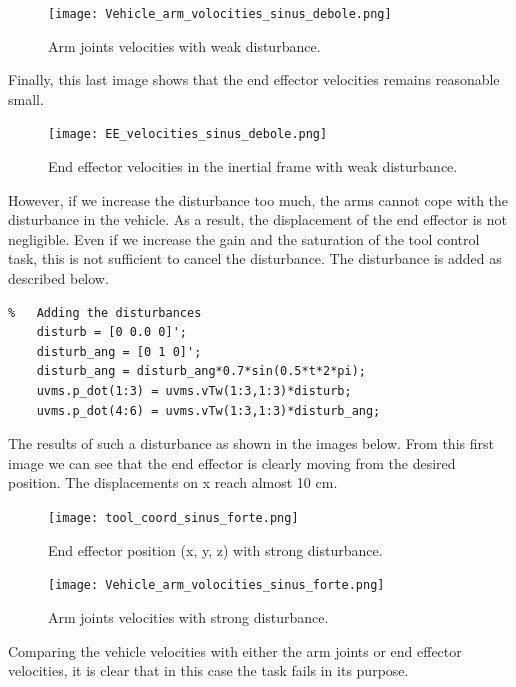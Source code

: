 \documentclass{article}
\begin{document}
\begin{figure}[H]
	\centering
	{\texttt{[image: Vehicle\_arm\_volocities\_sinus\_debole.png]}}
	\caption{Arm joints velocities with weak disturbance.}
	\label{im:arm_vel2}
\end{figure}
Finally, this last image shows that the end effector velocities remains reasonable small.  \\ 

\begin{figure}[H]
	\centering
	{\texttt{[image: EE\_velocities\_sinus\_debole.png]}}
	\caption{End effector velocities in the inertial frame with weak disturbance.}
	\label{im:tool_vel2}
\end{figure}
However, if we increase the disturbance too much, the arms cannot cope with the disturbance in the vehicle. As a result, the displacement of the end effector is not negligible. Even if we increase the gain and the saturation of the tool control task, this is not sufficient to cancel the disturbance. The disturbance is added as described below.
\begin{lstlisting}
%	Adding the disturbances
    disturb = [0 0.0 0]';
    disturb_ang = [0 1 0]';
    disturb_ang = disturb_ang*0.7*sin(0.5*t*2*pi);
    uvms.p_dot(1:3) = uvms.vTw(1:3,1:3)*disturb;
    uvms.p_dot(4:6) = uvms.vTw(1:3,1:3)*disturb_ang;
\end{lstlisting}
The results of such a disturbance as shown in the images below.
From this first image we can see that the end effector is clearly moving from the 
desired position. The displacements on x reach almost 10 cm.  \\

\begin{figure}[H]
	\centering
	{\texttt{[image: tool\_coord\_sinus\_forte.png]}}
	\caption{End effector position (x, y, z) with strong disturbance.}
	\label{im:tool_cord3}
\end{figure}

\begin{figure}[H]
	\centering
	{\texttt{[image: Vehicle\_arm\_volocities\_sinus\_forte.png]}}
	\caption{Arm joints velocities with strong disturbance.}
	\label{im:arm_vel3}
\end{figure}
Comparing the vehicle velocities with either the arm joints or end effector velocities, it is clear that in this case the task fails in its purpose. \\
\end{document}
